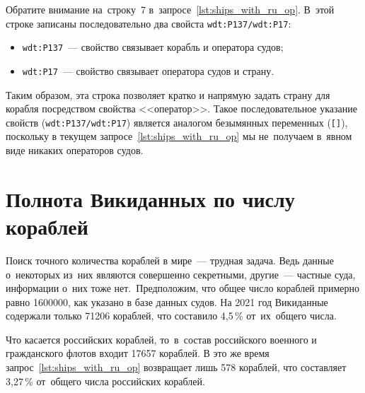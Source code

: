 Обратите внимание на~строку~7 в~запросе~\ref{lst:ships_with_ru_op}. 
В~этой строке записаны последовательно два свойста \texttt{wdt:P137/wdt:P17}:
\begin{itemize}
	\item \texttt{wdt:P137}~--- свойство  связывает корабль и оператора судов;
	\item \texttt{wdt:P17}~--- свойство  связывает оператора судов и страну.
\end{itemize}
Таким образом, эта строка позволяет кратко и напрямую задать страну для корабля 
посредством свойства <<оператор>>. 
Такое последовательное указание свойств (\texttt{wdt:P137/wdt:P17}) 
является аналогом безымянных переменных (\lstinline|[]|),
поскольку в текущем запросе~\ref{lst:ships_with_ru_op} 
мы не~получаем в~явном виде никаких операторов судов. 




\newpage
\section{Полнота Викиданных по числу кораблей}

Поиск точного количества кораблей в мире~--- трудная задача. 
Ведь данные о~некоторых из~них являются совершенно секретными, 
другие~--- частные суда, информации о~них тоже нет.\, 
Предположим, что общее число кораблей примерно равно \num{1600000}, 
как указано в базе данных судов. %
На 2021 год Викиданные содержали только \num{71206} кораблей, 
что составило 4,5\,\% от~их~общего числа.


Что касается российских кораблей, 
то~в~состав российского военного и гражданского флотов входит 
\num{17657} кораблей. %
В это же время запрос~\ref{lst:ships_with_ru_op} возвращает лишь 578 кораблей, 
что составляет 3,27\,\% от~общего числа российских кораблей. 

